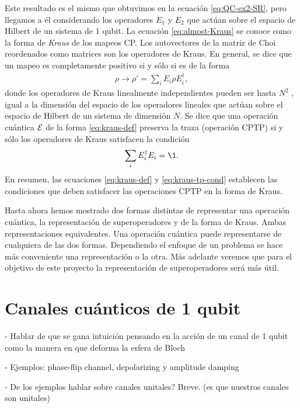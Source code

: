 Este resultado es el mismo que obtuvimos en la ecuación \eqref{eq:QC-ex2-SR},
pero llegamos a él considerando los operadores $E_1$ y $E_2$ que actúan
sobre el espacio de Hilbert de un sistema de 1 qubit.
La ecuación \eqref{eq:almost-Kraus} se conoce 
como la forma de \textit{Kraus} de los mapeos CP.
Los autovectores de la matriz de Choi reordenados como matrices son los 
operadores de Kraus. En general,
se dice que un mapeo es completamente positivo si y sólo si es de la forma
\cite{bengtsson_zyczkowski_2017}
\begin{align}
\rho \rightarrow \rho'=\sum_iE_i\rho E_i^{\dagger},
\label{eq:kraus-def}
\end{align}
donde los operadores de Kraus linealmente independientes 
pueden ser hasta $N^2$ \cite{nielsen_chuang_2011}, igual a la dimensión 
del espacio de los operadores lineales que actúan sobre el espacio de
Hilbert de un sistema de dimensión $N$. Se dice que una operación cuántica
$\mathcal{E}$ de la forma \eqref{eq:kraus-def} preserva la traza (operación CPTP) 
si y sólo los operadores de Kraus satisfacen la condición 
\cite{bengtsson_zyczkowski_2017}
\begin{align}
\sum_iE_i^{\dagger}E_i=\1.
\label{eq:kraus-tp-cond}
\end{align}
En resumen, las ecuaciones \eqref{eq:kraus-def} y \eqref{eq:kraus-tp-cond}
establecen las condiciones que deben satisfacer las operaciones CPTP en la 
forma de Kraus. 


Hasta ahora hemos mostrado dos formas distintas de representar una 
operación cuántica, la representación de superoperadores y de la forma 
de Kraus. Ambas representaciones equivalentes. Una operación 
cuántica puede representarse de cualquiera de las dos formas. Dependiendo
el enfoque de un problema se hace más conveniente una representación 
o la otra. Más adelante veremos que para el objetivo de este proyecto
la representación de superoperadores será más útil. 

\section{Canales cuánticos de 1 qubit}
- Hablar de que se gana intuición pensando en la acción de un canal de 1
qubit como la manera en que deforma la esfera de Bloch

- Ejemplos: phase-flip channel, depolarizing y amplitude damping 

- De los ejemplos hablar sobre canales unitales? Breve. (es que nuestros
canales son unitales)


